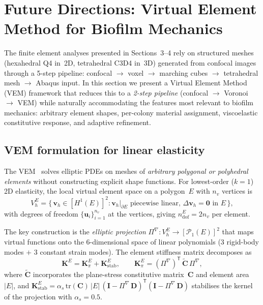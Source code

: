 
\section{Future Directions: Virtual Element Method for Biofilm Mechanics}
\label{sec:vem}

The finite element analyses presented in Sections~3--4 rely on structured meshes
(hexahedral Q4 in~2D, tetrahedral C3D4 in~3D) generated from confocal images
through a 5-step pipeline: confocal $\to$ voxel $\to$ marching cubes $\to$
tetrahedral mesh $\to$ Abaqus input.
In this section we present a Virtual Element Method (VEM) framework that
reduces this to a \emph{2-step pipeline} (confocal $\to$ Voronoi $\to$ VEM)
while naturally accommodating the features most relevant to biofilm mechanics:
arbitrary element shapes, per-colony material assignment, viscoelastic
constitutive response, and adaptive refinement.

\subsection{VEM formulation for linear elasticity}
\label{sec:vem:elasticity}

The VEM~\cite{BeiraodaVeiga2013,BeiraodaVeiga2014} solves elliptic PDEs on
meshes of \emph{arbitrary polygonal or polyhedral elements} without
constructing explicit shape functions.  For lowest-order ($k{=}1$) 2D
elasticity, the local virtual element space on a polygon~$E$ with $n_v$
vertices is
\begin{equation}
  V_h^E = \bigl\{\, \mathbf{v}_h \in [H^1(E)]^2 :
          \mathbf{v}_h|_{\partial E} \text{ piecewise linear},\,
          \Delta \mathbf{v}_h = \mathbf{0} \text{ in } E \,\bigr\},
\end{equation}
with degrees of freedom $\{\mathbf{u}_i\}_{i=1}^{n_v}$ at the vertices,
giving $n_{\mathrm{dof}}^E = 2n_v$ per element.

The key construction is the \emph{elliptic projection}
$\Pi^\nabla : V_h^E \to [\mathcal{P}_1(E)]^2$
that maps virtual functions onto the 6-dimensional space of linear
polynomials (3 rigid-body modes $+$ 3 constant strain modes).
The element stiffness matrix decomposes as
\begin{equation}
  \mathbf{K}^E = \mathbf{K}^E_\pi + \mathbf{K}^E_\mathrm{stab},
  \qquad
  \mathbf{K}^E_\pi = (\Pi^\nabla)^\mathsf{T}\, \tilde{\mathbf{C}}\, \Pi^\nabla,
  \label{eq:vem_stiffness}
\end{equation}
where $\tilde{\mathbf{C}}$ incorporates the plane-stress constitutive
matrix~$\mathbf{C}$ and element area~$|E|$, and
$\mathbf{K}^E_\mathrm{stab} = \alpha_s\, \mathrm{tr}(\mathbf{C})\,|E|\,
(\mathbf{I} - \Pi^\nabla\,\mathbf{D})^\mathsf{T}
(\mathbf{I} - \Pi^\nabla\,\mathbf{D})$
stabilises the kernel of the projection with $\alpha_s = 0.5$.

